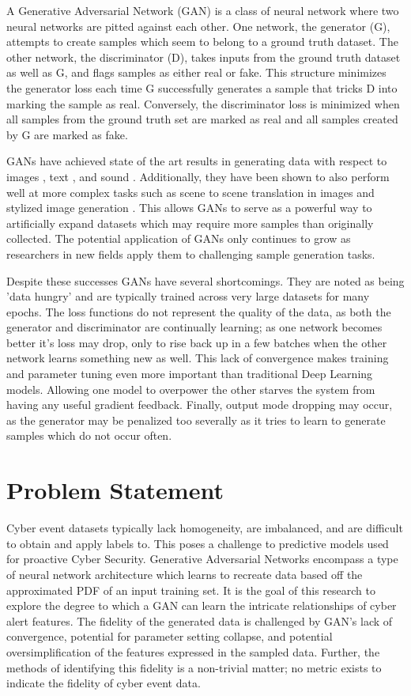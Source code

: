 A Generative Adversarial Network (GAN) is a class of neural network where two neural networks are pitted against each other. One network, the generator (G), attempts to create samples which seem to belong to a ground truth dataset. The other network, the discriminator (D), takes inputs from the ground truth dataset as well as G, and flags samples as either real or fake. This structure minimizes the generator loss each time G successfully generates a sample that tricks D into marking the sample as real. Conversely, the discriminator loss is minimized when all samples from the ground truth set are marked as real and all samples created by G are marked as fake.

GANs have achieved state of the art results in generating data with respect to images \cite {Karras2018, Zhu2017, Ledig2016}, text \cite{Su2018}, and sound \cite{Dong2018, Gao2018}.  Additionally, they have been shown to also perform well at more complex tasks such as scene to scene translation in images \cite{Zhu2017, Choi2017} and stylized image generation \cite{Karras2018}. This allows GANs to serve as a powerful way to artificially expand datasets which may require more samples than originally collected. The potential application of GANs only continues to grow as researchers in new fields apply them to challenging sample generation tasks.

Despite these successes GANs have several shortcomings. They are noted as being 'data hungry' and are typically trained across very large datasets for many epochs. The loss functions do not represent the quality of the data, as both the generator and discriminator are continually learning; as one network becomes better it's loss may drop, only to rise back up in a few batches when the other network learns something new as well. This lack of convergence makes training and parameter tuning even more important than traditional Deep Learning models. Allowing one model to overpower the other starves the system from having any useful gradient feedback. Finally, output mode dropping may occur, as the generator may be penalized too severally as it tries to learn to generate samples which do not occur often. 

\section{Problem Statement}

Cyber event datasets typically lack homogeneity, are imbalanced, and are difficult to obtain and apply labels to. This poses a challenge to predictive models used for proactive Cyber Security. Generative Adversarial Networks encompass a type of neural network architecture which learns to recreate data based off the approximated PDF of an input training set. It is the goal of this research to explore the degree to which a GAN can learn the intricate relationships of cyber alert features. The fidelity of the generated data is challenged by GAN’s lack of convergence, potential for parameter setting collapse, and potential oversimplification of the features expressed in the sampled data. Further, the methods of identifying this fidelity is a non-trivial matter; no metric exists to indicate the fidelity of cyber event data. 

